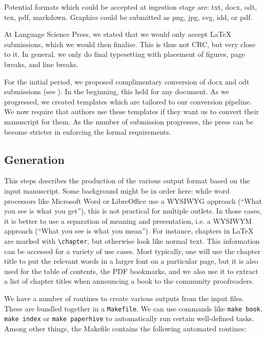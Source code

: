 \documentclass[nonflat,modfonts,output=book] {langsci/langscibook}
\begin{document}
Potential formats which could be accepted at ingestion stage are: txt, docx, odt, tex, pdf, markdown. Graphics could be submitted as png, jpg, svg, idd, or pdf. 


At Language Science Press, we stated that we would only accept \LaTeX\xspace submissions, which we would then finalise. This is thus not CRC, but very close to it. In general, we only do final typesetting with placement of figures, page breaks, and line breaks. 

For the initial period, we proposed complimentary conversion of docx and odt submissions (see ). In the beginning, this held for any document. As we progressed, we created templates which are tailored to our conversion pipeline. We now require that authors use these templates if they want us to convert their manuscript for them. As the number of submission progresses, the press can be become stricter in enforcing the formal requirements. 


\subsection{Generation}
This steps describes the production of the various output format based on the input manuscript. Some background might be in order here: while word processors like Microsoft Word or LibreOffice use a WYSIWYG approach (``What you see is what you get''), this is not practical for multiple outlets.
In those cases, it is better to use a separation of meaning and presentation, i.e. a WYSIWYM approach (``What you see is what you mean''). For instance, chapters in \LaTeX\xspace are marked with \verb+\chapter+, but otherwise look like normal text. This information can be accessed for a variety of use cases. Most typically, one will use the chapter title to put the relevant words in a larger font on a particular  page, but it is also used for the table of contents, the PDF bookmarks, and we also use it to extract a list of chapter titles when announcing a book to the community proofreaders. 

We have a number of routines to create various outputs from the input files. These are bundled together in a \verb+Makefile+. We can use commands like \verb+make book+, \verb+make index+ or \verb+make paperhive+ to automatically run certain well-defined tasks. Among other things, the Makefile contains the following automated routines: 
\end{document}
